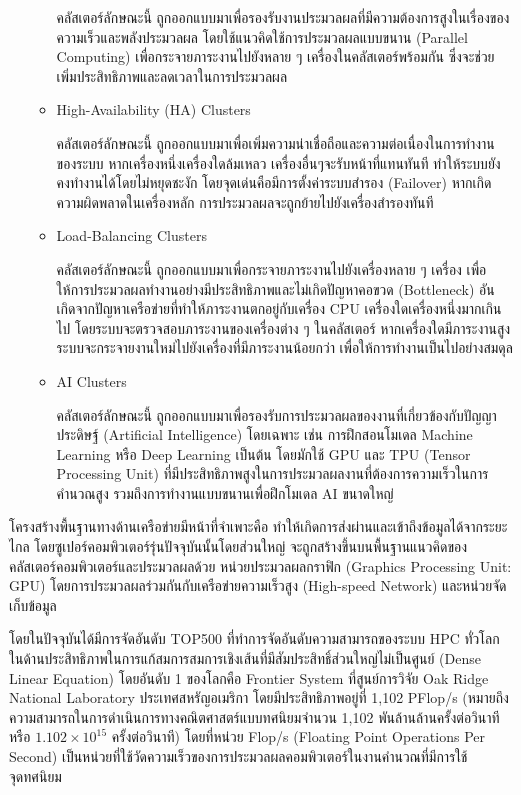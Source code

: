\documentclass[a4paper,12pt]{extarticle}
\begin{document}
\begin{itemize}
\begin{itemize}
		คลัสเตอร์ลักษณะนี้ ถูกออกแบบมาเพื่อรองรับงานประมวลผลที่มีความต้องการสูงในเรื่องของความเร็วและพลังประมวลผล โดยใช้แนวคิดใช้การประมวลผลแบบขนาน (Parallel Computing) เพื่อกระจายภาระงานไปยังหลาย ๆ เครื่องในคลัสเตอร์พร้อมกัน ซึ่งจะช่วยเพิ่มประสิทธิภาพและลดเวลาในการประมวลผล
		\item High-Availability (HA) Clusters

		คลัสเตอร์ลักษณะนี้ ถูกออกแบบมาเพื่อเพิ่มความน่าเชื่อถือและความต่อเนื่องในการทำงานของระบบ หากเครื่องหนึ่งเครื่องใดล้มเหลว เครื่องอื่นๆจะรับหน้าที่แทนทันที ทำให้ระบบยังคงทำงานได้โดยไม่หยุดชะงัก โดยจุดเด่นคือมีการตั้งค่าระบบสำรอง (Failover) หากเกิดความผิดพลาดในเครื่องหลัก การประมวลผลจะถูกย้ายไปยังเครื่องสำรองทันที
		\item Load-Balancing Clusters

		คลัสเตอร์ลักษณะนี้ ถูกออกแบบมาเพื่อกระจายภาระงานไปยังเครื่องหลาย ๆ เครื่อง เพื่อให้การประมวลผลทำงานอย่างมีประสิทธิภาพและไม่เกิดปัญหาคอขวด (Bottleneck) อันเกิดจากปัญหาเครือข่ายที่ทำให้ภาระงานตกอยู่กับเครื่อง CPU เครื่องใดเครื่องหนึ่งมากเกินไป โดยระบบจะตรวจสอบภาระงานของเครื่องต่าง ๆ ในคลัสเตอร์ หากเครื่องใดมีภาระงานสูง ระบบจะกระจายงานใหม่ไปยังเครื่องที่มีภาระงานน้อยกว่า เพื่อให้การทำงานเป็นไปอย่างสมดุล
		\item AI Clusters

		คลัสเตอร์ลักษณะนี้ ถูกออกแบบมาเพื่อรองรับการประมวลผลของงานที่เกี่ยวข้องกับปัญญาประดิษฐ์ (Artificial Intelligence) โดยเฉพาะ เช่น การฝึกสอนโมเดล Machine Learning หรือ Deep Learning เป็นต้น โดยมักใช้ GPU และ TPU (Tensor Processing Unit) ที่มีประสิทธิภาพสูงในการประมวลผลงานที่ต้องการความเร็วในการคำนวณสูง รวมถึงการทำงานแบบขนานเพื่อฝึกโมเดล AI ขนาดใหญ่
	\end{itemize}
\end{itemize}

โครงสร้างพื้นฐานทางด้านเครือข่ายมีหน้าที่จำเพาะคือ ทำให้เกิดการส่งผ่านและเข้าถึงข้อมูลได้จากระยะไกล โดยซูเปอร์คอมพิวเตอร์รุ่นปัจจุบันนั้นโดยส่วนใหญ่ จะถูกสร้างขึ้นบนพื้นฐานแนวคิดของคลัสเตอร์คอมพิวเตอร์และประมวลผลด้วย หน่วยประมวลผลกราฟิก (Graphics Processing Unit: GPU)
โดยการประมวลผลร่วมกันกับเครือข่ายความเร็วสูง (High-speed Network) และหน่วยจัดเก็บข้อมูล

โดยในปัจจุบันได้มีการจัดอันดับ TOP500 ที่ทำการจัดอันดับความสามารถของระบบ HPC ทั่วโลก ในด้านประสิทธิภาพในการแก้สมการสมการเชิงเส้นที่มีสัมประสิทธิ์ส่วนใหญ่ไม่เป็นศูนย์ (Dense Linear Equation) โดยอันดับ 1 ของโลกคือ Frontier System ที่สูนย์การวิจัย Oak Ridge National Laboratory ประเทศสหรัญอเมริกา โดยมีประสิทธิภาพอยู่ที่ 1,102 PFlop/s (หมายถึงความสามารถในการดำเนินการทางคณิตศาสตร์แบบทศนิยมจำนวน 1,102 พันล้านล้านครั้งต่อวินาที หรือ $1.102 \times 10^{15}$ ครั้งต่อวินาที) โดยที่หน่วย Flop/s (Floating Point Operations Per Second) เป็นหน่วยที่ใช้วัดความเร็วของการประมวลผลคอมพิวเตอร์ในงานคำนวณที่มีการใช้จุดทศนิยม
\end{document}
